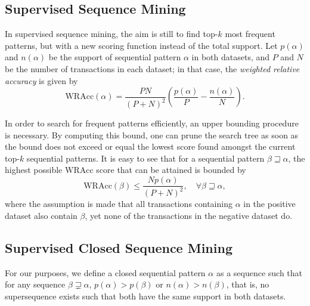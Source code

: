 \documentclass{sigkddExp}
\newcommand{\wracc}{\mathrm{WRAcc}}
\begin{document}
\subsection{Supervised Sequence Mining}
\label{sec:ssm}
In supervised sequence mining, the aim is still to find top-\(k\) most frequent patterns, but with a new scoring function instead of the total support.
Let \(p(\alpha)\) and \(n(\alpha)\) be the support of sequential pattern \(\alpha\) in both datasets, and \(P\) and \(N\) be the number of transactions in each dataset; in that case, the \emph{weighted relative accuracy} is given by
\begin{equation}
\wracc(\alpha) = \frac{PN}{(P + N)^2} \left(\frac{p(\alpha)}{P} - \frac{n(\alpha)}{N}\right).
\end{equation}

In order to search for frequent patterns efficiently, an upper bounding procedure is necessary.
By computing this bound, one can prune the search tree as soon as the bound does not exceed or equal the lowest score found amongst the current top-\(k\) sequential patterns.
It is easy to see that for a sequential pattern \(\beta \sqsupseteq \alpha\), the highest possible \(\wracc\) score that can be attained is bounded by
\begin{equation}
\wracc(\beta) \leqslant \frac{N p(\alpha)}{(P + N)^2}, \quad \forall \beta \sqsupseteq \alpha,
\end{equation}
where the assumption is made that all transactions containing \(\alpha\) in the positive dataset also contain \(\beta\), yet none of the transactions in the negative dataset do.

\subsection{Supervised Closed Sequence Mining}
\label{sec:scsm}
For our purposes, we define a closed sequential pattern \(\alpha\) as a sequence such that for any sequence \(\beta \sqsupsetneq \alpha\), \(p(\alpha) > p(\beta)\) or \(n(\alpha) > n(\beta)\), that is, no supersequence exists such that both have the same support in both datasets.
\end{document}
